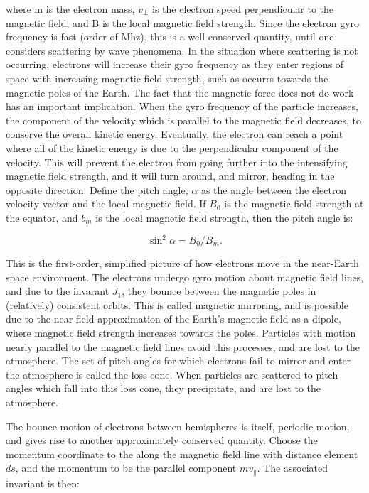 where m is the electron mass, $v_{\perp}$ is the electron speed perpendicular to the magnetic field, and B is the local magnetic field strength. Since the electron gyro frequency is fast (order of Mhz), this is a well conserved quantity, until one considers scattering by wave phenomena. In the situation where scattering is not occurring, electrons will increase their gyro frequency as they enter regions of space with increasing magnetic field strength, such as occurrs towards the magnetic poles of the Earth. The fact that the magnetic force does not do work has an important implication. When the gyro frequency of the particle increases, the component of the velocity which is parallel to the magnetic field decreases, to conserve the overall kinetic energy. Eventually, the electron can reach a point where all of the kinetic energy is due to the perpendicular component of the velocity. This will prevent the electron from going further into the intensifying magnetic field strength, and it will turn around, and mirror, heading in the opposite direction. Define the pitch angle, $\alpha$ as the angle between the electron velocity vector and the local magnetic field. If $B_0$ is the magnetic field strength at the equator, and $b_m$ is the local magnetic field strength, then the pitch angle is:

$$\sin^2\alpha = B_0/B_m.$$

This is the first-order, simplified picture of how electrons move in the near-Earth space environment. The electrons undergo gyro motion about magnetic field lines, and due to the invarant $J_1$, they bounce between the magnetic poles in (relatively) consistent orbits. This is called magnetic mirroring, and is possible due to the near-field approximation of the Earth's magnetic field as a dipole, where magnetic field strength increases towards the poles. Particles with motion nearly parallel to the magnetic field lines avoid this processes, and are lost to the atmosphere. The set of pitch angles for which electrons fail to mirror and enter the atmosphere is called the loss cone. When particles are scattered to pitch angles which fall into this loss cone, they precipitate, and are lost to the atmosphere. 

The bounce-motion of electrons between hemispheres is itself, periodic motion, and gives rise to another approximately conserved quantity. Choose the momentum coordinate to the along the magnetic field line with distance element $ds$, and the momentum to be the parallel component $mv_{\parallel}$. The associated invariant is then:

